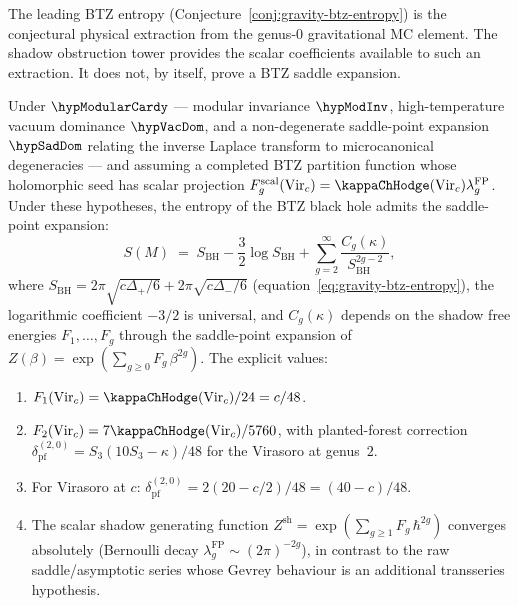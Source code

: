 The leading BTZ entropy (Conjecture~\ref{conj:gravity-btz-entropy})
is the conjectural physical extraction from the genus-$0$
gravitational MC element. The shadow obstruction tower provides the
scalar coefficients available to such an extraction. It does not, by
itself, prove a BTZ saddle expansion.

\begin{proposition}
\label{prop:gravity-btz-genus-expansion}
Under $\hypModularCardy$ — modular invariance $\hypModInv$,
high-temperature vacuum dominance $\hypVacDom$, and a non-degenerate
saddle-point expansion $\hypSadDom$ relating the inverse Laplace
transform to microcanonical degeneracies — and assuming a completed
BTZ partition function whose holomorphic seed has scalar projection
$F_g^{\mathrm{scal}}(\mathrm{Vir}_c)
=\kappaChHodge(\mathrm{Vir}_c)\lambda_g^{\mathrm{FP}}$.
Under these hypotheses, the
entropy of the BTZ black hole admits the saddle-point expansion:
\begin{equation}\label{eq:gravity-btz-full-expansion}
S(M)
\;=\;
S_{\mathrm{BH}}
- \frac{3}{2}\log S_{\mathrm{BH}}
+ \sum_{g=2}^{\infty}
\frac{C_g(\kappa)}{S_{\mathrm{BH}}^{2g-2}},
\end{equation}
where $S_{\mathrm{BH}} = 2\pi\sqrt{c\Delta_+/6}
+ 2\pi\sqrt{c\Delta_-/6}$
\textup{(}equation~\eqref{eq:gravity-btz-entropy}\textup{)},
the logarithmic coefficient $-3/2$ is universal, and
$C_g(\kappa)$ depends on the shadow free energies
$F_1, \ldots, F_g$ through the saddle-point expansion of
$Z(\beta) = \exp(\sum_{g \ge 0} F_g\,\beta^{2g})$.
The explicit values:
\begin{enumerate}[label=\textup{(\roman*)}]
\item $F_1(\mathrm{Vir}_c)=\kappaChHodge(\mathrm{Vir}_c)/24=c/48$.
\item $F_2(\mathrm{Vir}_c)=7\kappaChHodge(\mathrm{Vir}_c)/5760$,
 with planted-forest correction
 $\delta_{\mathrm{pf}}^{(2,0)} = S_3(10S_3 - \kappa)/48$
 for the Virasoro at genus~$2$.
\item For Virasoro at $c$:
 $\delta_{\mathrm{pf}}^{(2,0)}
 = 2(20 - c/2)/48 = (40 - c)/48$.
\item The scalar shadow generating function
 $Z^{\mathrm{sh}}
 = \exp(\sum_{g \ge 1} F_g\,\hbar^{2g})$
 converges absolutely
 \textup{(}Bernoulli decay
 $\lambda_g^{\mathrm{FP}}
 \sim (2\pi)^{-2g}$\textup{)},
 in contrast to the raw saddle/asymptotic series whose Gevrey
 behaviour is an additional transseries hypothesis.
\end{enumerate}
\end{proposition}


